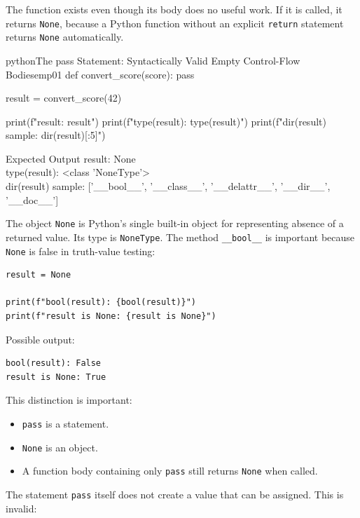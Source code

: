 \documentclass[a4paper,twoside]{report}
\begin{document}
The function exists even though its body does no useful work. If it is called, it returns \texttt{None}, because a Python function without an explicit \texttt{return} statement returns \texttt{None} automatically.

\begin{codebox}[]{python}{The pass Statement: Syntactically Valid Empty Control-Flow Bodies}{emp01}
def convert_score(score):
    pass

result = convert_score(42)

print(f"result: {result}")
print(f"type(result): {type(result)}")
print(f"dir(result) sample: {dir(result)[:5]}")
\end{codebox}


\begin{iobox}{Expected Output}
result: None \\
type(result): <class 'NoneType'> \\
dir(result) sample: ['\_\_bool\_\_', '\_\_class\_\_', '\_\_delattr\_\_', '\_\_dir\_\_', '\_\_doc\_\_'] \\
\end{iobox}




The object \texttt{None} is Python's single built-in object for representing absence of a returned value. Its type is \texttt{NoneType}. The method \texttt{\_\_bool\_\_} is important because \texttt{None} is false in truth-value testing:

\begin{verbatim}
result = None

print(f"bool(result): {bool(result)}")
print(f"result is None: {result is None}")
\end{verbatim}

Possible output:

\begin{verbatim}
bool(result): False
result is None: True
\end{verbatim}

This distinction is important:

\begin{itemize}
    \item \texttt{pass} is a statement.
    \item \texttt{None} is an object.
    \item A function body containing only \texttt{pass} still returns \texttt{None} when called.
\end{itemize}

The statement \texttt{pass} itself does not create a value that can be assigned. This is invalid:
\end{document}
